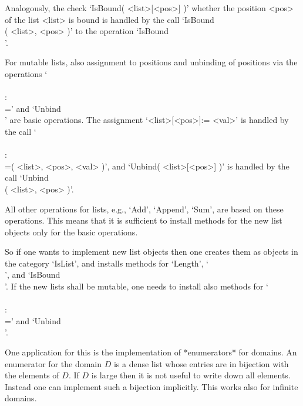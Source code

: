 Analogously, the check `IsBound( <list>[<pos>] )' whether the position
<pos> of the list <list> is bound is handled by the call
`IsBound\\[\\]( <list>, <pos> )' to the operation
`IsBound\\[\\]'.

For mutable lists, also assignment to positions and unbinding of
positions via the operations `\\[\\]\\:\\=' and `Unbind\\[\\]'
are basic operations.
The assignment `<list>[<pos>]:= <val>' is handled by the call
`\\[\\]\\:\\=( <list>, <pos>, <val> )',
and `Unbind( <list>[<pos>] )' is handled by the call
`Unbind\\[\\]( <list>, <pos> )'.

All other operations for lists, e.g., `Add', `Append', `Sum',
are based on these operations.
This means that it is sufficient to install methods for the new list
objects only for the basic operations.

So if one wants to implement new list objects then one creates them
as objects in the category `IsList', and installs methods for `Length',
`\\[\\]', and `IsBound\\[\\]'.
If the new lists shall be mutable, one needs to install also methods
for `\\[\\]\\:\\=' and `Unbind\\[\\]'.

One application for this is the implementation of *enumerators*
for domains.
An enumerator for the domain $D$ is a dense list whose entries are
in bijection with the elements of $D$.
If $D$ is large then it is not useful to write down all elements.
Instead one can implement such a bijection implicitly.
This works also for infinite domains.

